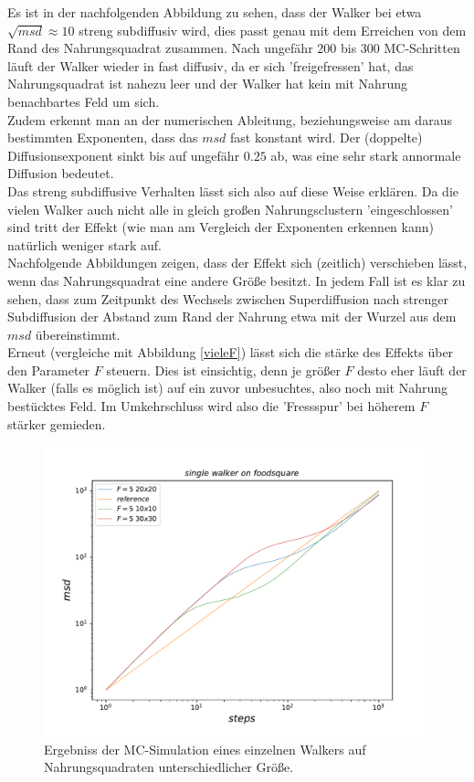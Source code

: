 \documentclass[a4paper, 12pt]{scrartcl}
\begin{document}
\noindent Es ist in der nachfolgenden Abbildung zu sehen, dass der Walker bei etwa $\sqrt{msd} \approx 10$ streng subdiffusiv wird, dies passt genau mit dem Erreichen von dem Rand des Nahrungsquadrat zusammen. Nach ungefähr 200 bis 300 MC-Schritten läuft der Walker wieder in fast diffusiv, da er sich 'freigefressen' hat, das Nahrungsquadrat ist nahezu leer und der Walker hat kein mit Nahrung benachbartes Feld um sich. 
\\
\noindent Zudem erkennt man an der numerischen Ableitung, beziehungsweise am daraus bestimmten Exponenten, dass das $msd$ fast konstant wird. Der (doppelte) Diffusionsexponent sinkt bis auf ungefähr $0.25$ ab, was eine sehr stark annormale Diffusion bedeutet.
\\
\noindent Das streng subdiffusive Verhalten lässt sich also auf diese Weise erklären. Da die vielen Walker auch nicht alle in gleich großen Nahrungsclustern 'eingeschlossen' sind tritt der Effekt (wie man am Vergleich der Exponenten erkennen kann) natürlich weniger stark auf.
\\
\noindent Nachfolgende Abbildungen zeigen, dass der Effekt sich (zeitlich) verschieben lässt, wenn das Nahrungsquadrat eine andere Größe besitzt. In jedem Fall ist es klar zu sehen, dass zum Zeitpunkt des Wechsels zwischen Superdiffusion nach strenger Subdiffusion der Abstand zum Rand der Nahrung etwa mit der Wurzel aus dem $msd$ übereinstimmt.
\\
\noindent Erneut (vergleiche mit Abbildung \ref{vieleF}) lässt sich die stärke des Effekts über den Parameter $F$ steuern. Dies ist einsichtig, denn je größer $F$ desto eher läuft der Walker (falls es möglich ist) auf ein zuvor unbesuchtes, also noch mit Nahrung bestücktes Feld. Im Umkehrschluss wird also die 'Fressspur' bei höherem $F$ stärker gemieden.

\begin{figure}[H]
	\centering
	\includegraphics[scale=0.8]{abc.pdf}
	\caption{Ergebniss der MC-Simulation eines einzelnen Walkers auf Nahrungsquadraten unterschiedlicher Größe.}
\end{figure}
\end{document}
